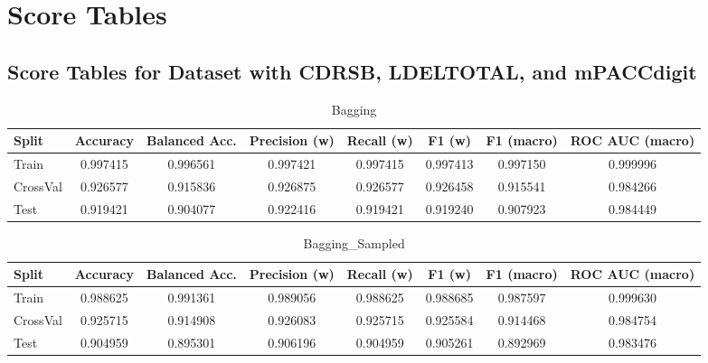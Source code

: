 \newpage
\section{Score Tables}
\subsection{Score Tables for Dataset with CDRSB, LDELTOTAL, and mPACCdigit}
\begin{table}[H]
	\centering
	\caption{Bagging}
	\begin{adjustbox}{max width=\textwidth}
		\begin{tabular}{lccccccc}
			\toprule
			Split & Accuracy & Balanced Acc. & Precision (w) & Recall (w) & F1 (w) & F1 (macro) & ROC AUC (macro) \\
			\midrule
			Train & 0.997415 & 0.996561 & 0.997421 & 0.997415 & 0.997413 & 0.997150 & 0.999996 \\
			CrossVal & 0.926577 & 0.915836 & 0.926875 & 0.926577 & 0.926458 & 0.915541 & 0.984266 \\
			Test & 0.919421 & 0.904077 & 0.922416 & 0.919421 & 0.919240 & 0.907923 & 0.984449 \\
			\bottomrule
		\end{tabular}
	\end{adjustbox}
\end{table}

\begin{table}[H]
	\centering
	\caption{Bagging\_Sampled}
	\begin{adjustbox}{max width=\textwidth}
		\begin{tabular}{lccccccc}
			\toprule
			Split & Accuracy & Balanced Acc. & Precision (w) & Recall (w) & F1 (w) & F1 (macro) & ROC AUC (macro) \\
			\midrule
			Train & 0.988625 & 0.991361 & 0.989056 & 0.988625 & 0.988685 & 0.987597 & 0.999630 \\
			CrossVal & 0.925715 & 0.914908 & 0.926083 & 0.925715 & 0.925584 & 0.914468 & 0.984754 \\
			Test & 0.904959 & 0.895301 & 0.906196 & 0.904959 & 0.905261 & 0.892969 & 0.983476 \\
			\bottomrule
		\end{tabular}
	\end{adjustbox}
\end{table}

